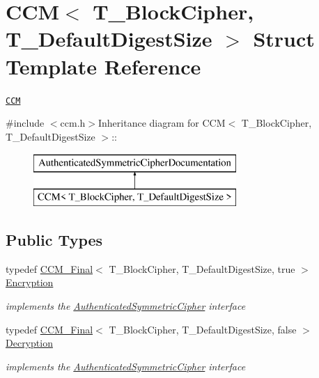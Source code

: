 \hypertarget{struct_c_c_m}{
\section{CCM$<$ T\_\-BlockCipher, T\_\-DefaultDigestSize $>$ Struct Template Reference}
\label{struct_c_c_m}
}


\href{http://www.cryptolounge.org/wiki/CCM}{\tt CCM}  


{\ttfamily \#include $<$ccm.h$>$}Inheritance diagram for CCM$<$ T\_\-BlockCipher, T\_\-DefaultDigestSize $>$::\begin{figure}[H]
\begin{center}
\leavevmode
\includegraphics[height=2cm]{struct_c_c_m}
\end{center}
\end{figure}
\subsection*{Public Types}
\begin{DoxyCompactItemize}
\item 
\hypertarget{struct_c_c_m_af799688feec67aa8587920d787c2d8ec}{
typedef \hyperlink{class_c_c_m___final}{CCM\_\-Final}$<$ T\_\-BlockCipher, T\_\-DefaultDigestSize, true $>$ \hyperlink{struct_c_c_m_af799688feec67aa8587920d787c2d8ec}{Encryption}}
\label{struct_c_c_m_af799688feec67aa8587920d787c2d8ec}

\begin{DoxyCompactList}\small\item\em implements the \hyperlink{class_authenticated_symmetric_cipher}{AuthenticatedSymmetricCipher} interface \item\end{DoxyCompactList}\item 
\hypertarget{struct_c_c_m_a0042f3a28579b571f27647803368b56e}{
typedef \hyperlink{class_c_c_m___final}{CCM\_\-Final}$<$ T\_\-BlockCipher, T\_\-DefaultDigestSize, false $>$ \hyperlink{struct_c_c_m_a0042f3a28579b571f27647803368b56e}{Decryption}}
\label{struct_c_c_m_a0042f3a28579b571f27647803368b56e}

\begin{DoxyCompactList}\small\item\em implements the \hyperlink{class_authenticated_symmetric_cipher}{AuthenticatedSymmetricCipher} interface \item\end{DoxyCompactList}\end{DoxyCompactItemize}


